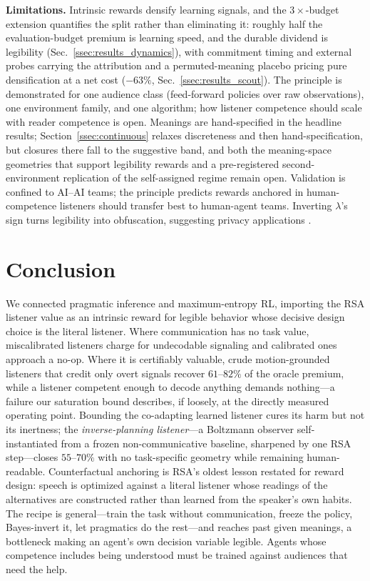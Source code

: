 \documentclass[sigconf,review,anonymous]{acmart}
\begin{document}
\textbf{Limitations.} Intrinsic rewards densify learning signals, and the $3\times$-budget extension quantifies the split rather than eliminating it: roughly half the evaluation-budget premium is learning speed, and the durable dividend is legibility (Sec.~\ref{ssec:results_dynamics}), with commitment timing and external probes carrying the attribution and a permuted-meaning placebo pricing pure densification at a net cost ($-63\%$, Sec.~\ref{ssec:results_scout}). The principle is demonstrated for one audience class (feed-forward policies over raw observations), one environment family, and one algorithm; how listener competence should scale with reader competence is open. Meanings are hand-specified in the headline results; Section~\ref{ssec:continuous} relaxes discreteness and then hand-specification, but closures there fall to the suggestive band, and both the meaning-space geometries that support legibility rewards and a pre-registered second-environment replication of the self-assigned regime remain open. Validation is confined to AI--AI teams; the principle predicts rewards anchored in human-competence listeners should transfer best to human-agent teams. Inverting $\lambda$'s sign turns legibility into obfuscation, suggesting privacy applications \cite{strouse2018learning}.

\section{Conclusion}
\label{sec:conclusion}

We connected pragmatic inference and maximum-entropy RL, importing the RSA listener value as an intrinsic reward for legible behavior whose decisive design choice is the literal listener. Where communication has no task value, miscalibrated listeners charge for undecodable signaling and calibrated ones approach a no-op. Where it is certifiably valuable, crude motion-grounded listeners that credit only overt signals recover $61$--$82\%$ of the oracle premium, while a listener competent enough to decode anything demands nothing---a failure our saturation bound describes, if loosely, at the directly measured operating point. Bounding the co-adapting learned listener cures its harm but not its inertness; the \emph{inverse-planning listener}---a Boltzmann observer self-instantiated from a frozen non-communicative baseline, sharpened by one RSA step---closes $55$--$70\%$ with no task-specific geometry while remaining human-readable. Counterfactual anchoring is RSA's oldest lesson restated for reward design: speech is optimized against a literal listener whose readings of the alternatives are constructed rather than learned from the speaker's own habits. The recipe is general---train the task without communication, freeze the policy, Bayes-invert it, let pragmatics do the rest---and reaches past given meanings, a bottleneck making an agent's own decision variable legible. Agents whose competence includes being understood must be trained against audiences that need the help.
\end{document}
